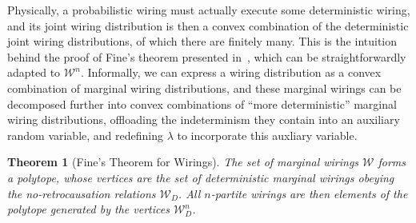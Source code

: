 \documentclass[10pt, a4paper]{article}
\numberwithin{equation}{section} %
\newcounter{stmt} %
\theoremstyle{definition}
\theoremstyle{plain}
\newtheorem{theorem}[stmt]{Theorem}
\newcommand{\?}{\mathrel{?}} %
\newcommand{\sW}{\mathcal{W}}
\begin{document}
              Physically, a probabilistic wiring must actually execute some deterministic wiring, and its joint wiring distribution is then a convex combination of the deterministic joint wiring distributions, of which there are finitely many. This is the intuition behind the proof of Fine's theorem presented in~\cite{BellNonlocality}, which can be straightforwardly adapted to \(\sW^n\). Informally, we can express a wiring distribution as a convex combination of marginal wiring distributions, and these marginal wirings can be decomposed further into convex combinations of ``more deterministic'' marginal wiring distributions, offloading the indeterminism they contain into an auxiliary random variable, and redefining \(\lambda\) to incorporate this auxliary variable.
              \begin{theorem}[Fine's Theorem for Wirings]
                The set of marginal wirings \(\sW\) forms a polytope, whose vertices are the set of deterministic marginal wirings obeying the no-retrocausation relations \(\sW_D\). All \(n\)-partite wirings are then elements of the polytope generated by the vertices \(\sW_D^n\).
              \end{theorem}
\end{document}
